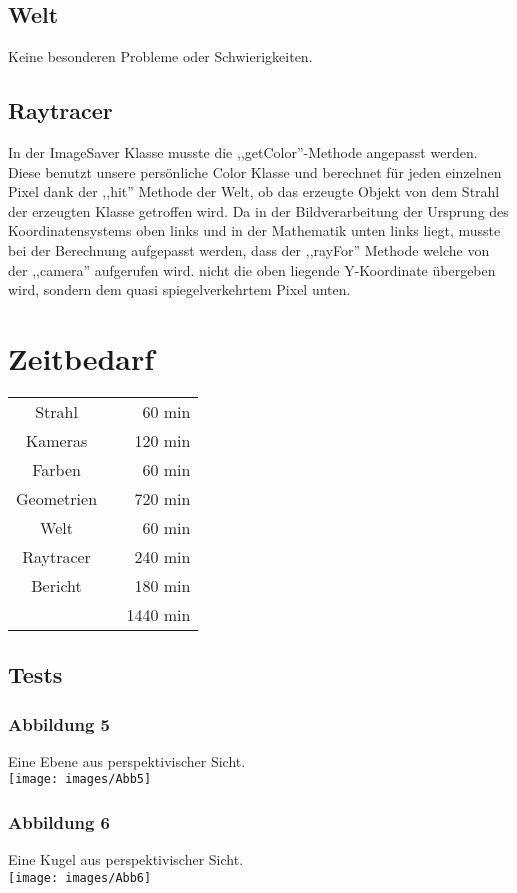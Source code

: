 \documentclass[14pt]{extarticle}
\begin{document}
\subsection{Welt}
Keine besonderen Probleme oder Schwierigkeiten.
\subsection{Raytracer}

In der ImageSaver Klasse musste die ,,getColor''-Methode angepasst werden. Diese benutzt unsere persönliche Color Klasse und berechnet für jeden einzelnen Pixel dank der ,,hit'' Methode der Welt, ob das erzeugte Objekt von dem Strahl der erzeugten Klasse getroffen wird. Da in der Bildverarbeitung der Ursprung des Koordinatensystems oben links und in der Mathematik unten links liegt, musste bei der Berechnung aufgepasst werden, dass der ,,rayFor'' Methode welche von der ,,camera'' aufgerufen wird. nicht die oben liegende Y-Koordinate übergeben wird, sondern dem quasi spiegelverkehrtem Pixel unten. 

\section{Zeitbedarf}
\begin{center}
\begin{tabular}{cr}
Strahl	  \	&60 min	\\
Kameras 	\	&120 min	\\
Farben \	&60 min	\\
Geometrien \	&720 min	\\
Welt \	&60 min	\\
Raytracer \	&240 min	\\
Bericht  \		&180 min	 \\
	\hline
	&1440 min
\end{tabular}
\end{center}

\subsection{Tests}
\subsubsection{Abbildung 5}
Eine Ebene aus perspektivischer Sicht.\\
\texttt{[image: images/Abb5]}\\

\subsubsection{Abbildung 6}
Eine Kugel aus perspektivischer Sicht.\\
\texttt{[image: images/Abb6]}\\
\end{document}
